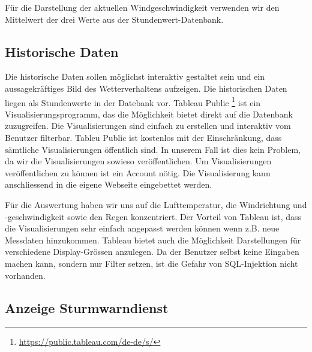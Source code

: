 Für die Darstellung der aktuellen Windgeschwindigkeit verwenden wir den Mittelwert der drei Werte aus der Stundenwert-Datenbank.



\subsection{Historische Daten}
Die historische Daten sollen möglichst interaktiv gestaltet sein und ein aussagekräftiges Bild des Wetterverhaltens aufzeigen. Die historischen Daten liegen als Stundenwerte in der Datebank vor.
Tableau Public \footnote{ \url{https://public.tableau.com/de-de/s/}} ist ein Visualisierungsprogramm, das die Möglichkeit bietet direkt auf die Datenbank zuzugreifen. Die Visualisierungen sind einfach zu erstellen und interaktiv vom Benutzer filterbar.
Tableu Public ist kostenlos mit der Einschränkung, dass sämtliche Visualisierungen öffentlich sind. In unserem Fall ist dies kein Problem, da wir die Visualisierungen sowieso veröffentlichen. Um Visualisierungen veröffentlichen zu können ist ein Account nötig. Die Visualisierung kann anschliessend in die eigene Webseite eingebettet werden.

Für die Auswertung haben wir uns auf die Lufttemperatur, die Windrichtung und -geschwindigkeit sowie den Regen konzentriert.
Der Vorteil von Tableau ist, dass die Visualisierungen sehr einfach angepasst werden können wenn z.B. neue Messdaten hinzukommen. Tableau bietet auch die Möglichkeit Darstellungen für verschiedene Display-Grössen anzulegen. Da der Benutzer selbst keine Eingaben machen kann, sondern nur Filter setzen, ist die Gefahr von SQL-Injektion nicht vorhanden.







\subsection{Anzeige Sturmwarndienst}
